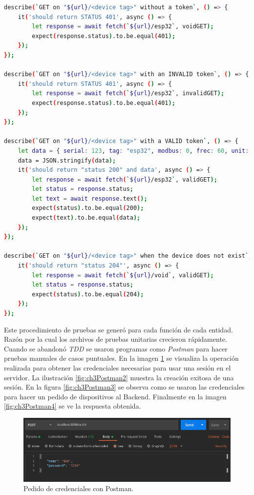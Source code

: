 \begin{lstlisting}[language=bash,label=cod:ch3BackendUnitTest,caption=Extracto de prueba unitaria Backend.]
describe(`GET on "${url}/<device tag>" without a token`, () => {
    it('should return STATUS 401', async () => {
        let response = await fetch(`${url}/esp32`, voidGET);
        expect(response.status).to.be.equal(401);
    });
});

describe(`GET on "${url}/<device tag>" with an INVALID token`, () => {
    it('should return STATUS 401', async () => {
        let response = await fetch(`${url}/esp32`, invalidGET);
        expect(response.status).to.be.equal(401);
    });
});

describe(`GET on "${url}/<device tag>" with a VALID token`, () => {
    let data = { serial: 123, tag: "esp32", modbus: 0, frec: 60, unit: "t" };
    data = JSON.stringify(data);
    it('should return "status 200" and data', async () => {
        let response = await fetch(`${url}/esp32`, validGET);
        let status = response.status;
        let text = await response.text();
        expect(status).to.be.equal(200);
        expect(text).to.be.equal(data);
    });
});

describe(`GET on "${url}/<device tag>" when the device does not exist`, () => {
    it('should return "status 204"', async () => {
        let response = await fetch(`${url}/void`, validGET);
        let status = response.status;
        expect(status).to.be.equal(204);
    });
});
\end{lstlisting}

Este procedimiento de pruebas se generó para cada función de cada entidad.
Razón por la cual los archivos de pruebas unitarias crecieron rápidamente.
Cuando se abandonó \emph{TDD} se usaron programas como \emph{Postman} para hacer pruebas manuales de casos puntuales.
En la imagen \ref{fig:ch3Postman1} se visualiza la operación realizada para obtener las credenciales necesarias para usar una sesión en el servidor.
La ilustración \ref{fig:ch3Postman2} muestra la creación exitosa de una sesión.
En la figura \ref{fig:ch3Postman3} se observa como se usaron las credenciales para hacer un pedido de dispositivos al Backend.
Finalmente en la imagen \ref{fig:ch3Postman4} se ve la respuesta obtenida. 


\begin{figure}[h]
	\centering
	\includegraphics[width=\textwidth]{./Figures/postman1.png}
	\caption{Pedido de credenciales con Postman.}
	\label{fig:ch3Postman1}
\end{figure}

